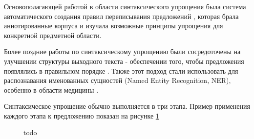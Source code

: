 
Основополагающей работой в области синтаксического упрощения была система автоматического создания правил переписывания предложений \cite{chandrasekar_automatic_1997}, которая брала аннотированные корпуса и изучала возможные принципы упрощения для конкретной предметной области.  

Более поздние работы по синтаксическому упрощению были сосредоточены на улучшении структуры выходного текста - обеспечении того, чтобы предложения появлялись в правильном порядке \cite{siddharthan_syntactic_2006}. Также этот подход стали использовать для распознавания именованных сущностей (Named Entity Recognition, NER), особенно в области медицины \cite{jonnalagadda_biosimplify_2010}.

Синтаксическое упрощение обычно выполняется в три этапа. Пример применения каждого этапа к предложению показан на рисунке \ref{fig:3steps}

\begin{figure}[h!]
	
	
	\caption{todo}
	
	\label{fig:3steps}
	
\end{figure}

